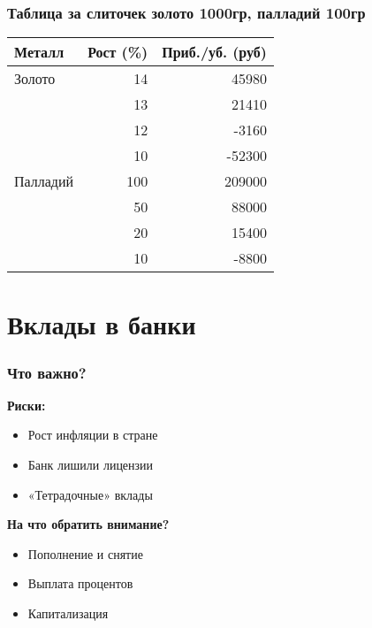 \documentclass{beamer}
\newcommand{\col}{\textcolor[rgb]{0.2,0.,0.55}}
\begin{document}
		\begin{frame}
			\frametitle{Таблица за слиточек золото 1000гр, палладий 100гр}
			
				\centering
				\begin{tabular}{ l r r }
					\toprule
					Металл   & Рост (\%) & Приб./уб. (руб) \\ \midrule
					Золото   & 14        & 45980           \\
					         & 13        & 21410           \\
					         & 12        & -3160           \\
					         & 10        & -52300          \\[2mm]
					Палладий & 100       & 209000          \\
					         & 50        & 88000           \\
					         & 20        & 15400           \\
					         & 10        & -8800           \\ \bottomrule
				\end{tabular}
			
		\end{frame}

	\section{Вклады в банки}
		
		\begin{frame}
			\frametitle{Что важно?}
			
			\col{\textbf{Риски:}}
			\begin{itemize}
				\item Рост инфляции в стране
				\item Банк лишили лицензии
				\item «Тетрадочные» вклады
			\end{itemize}
			
			\col{\textbf{На что обратить внимание?}}
			\begin{itemize}
			\item Пополнение и снятие
			\item Выплата процентов
			\item Капитализация
			\end{itemize}
		\end{frame}

		
		\begin{frame}
			\frametitle{}
		
		
		\end{frame}
		
		\begin{frame}
			\frametitle{}
		
		
		\end{frame}
		
		\begin{frame}
			\frametitle{}
		
		
		\end{frame}
		
		\begin{frame}
			\frametitle{}
		
		
		\end{frame}
\end{document}
